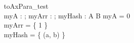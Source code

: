 \begin{schema}{toAxPara\_test}\\
 myA : \nat ;
 myArr : \power \nat ;
 myHash : \power A \cross B
\where
 myA = 0 \\
 myArr = \{ 1 \} \\
 myHash = \{ (a, b) \}
\end{schema}
